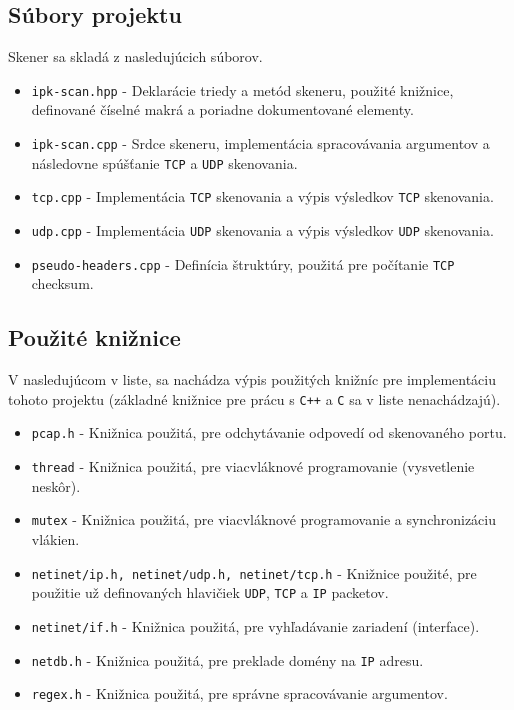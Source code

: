 \documentclass[titlepage]{article}
\begin{document}
\subsection{Súbory projektu}
Skener sa skladá z nasledujúcich súborov.

\begin{itemize}
	\item \verb|ipk-scan.hpp| - Deklarácie triedy a metód skeneru, použité knižnice, definované číselné makrá a poriadne dokumentované elementy.
	\item \verb|ipk-scan.cpp| - Srdce skeneru, implementácia spracovávania argumentov a následovne spúšťanie \verb|TCP| a \verb|UDP| skenovania.
	\item \verb|tcp.cpp| - Implementácia \verb|TCP| skenovania a výpis výsledkov \verb|TCP| skenovania.
	\item \verb|udp.cpp| - Implementácia \verb|UDP| skenovania a výpis výsledkov \verb|UDP| skenovania.
	\item \verb|pseudo-headers.cpp| - Definícia štruktúry, použitá pre počítanie \verb|TCP| checksum.
\end{itemize}

\subsection{Použité knižnice}
V nasledujúcom v liste, sa nachádza výpis použitých knižníc pre implementáciu tohoto projektu (základné knižnice pre prácu s \verb|C++| a \verb|C| sa v liste nenachádzajú).

\begin{itemize}
	\item \verb|pcap.h| - Knižnica použitá, pre odchytávanie odpovedí od skenovaného portu.
	\item \verb|thread| - Knižnica použitá, pre viacvláknové programovanie (vysvetlenie neskôr).
	\item \verb|mutex| - Knižnica použitá, pre viacvláknové programovanie a synchronizáciu vlákien.
	\item \verb|netinet/ip.h, netinet/udp.h, netinet/tcp.h| - Knižnice použité, pre použitie už definovaných hlavičiek \verb|UDP|, \verb|TCP| a \verb|IP| packetov.
	\item \verb|netinet/if.h| - Knižnica použitá, pre vyhľadávanie zariadení (interface).
	\item \verb|netdb.h| - Knižnica použitá, pre preklade domény na \verb|IP| adresu.
	\item \verb|regex.h| - Knižnica použitá, pre správne spracovávanie argumentov.
\end{itemize}
\end{document}
